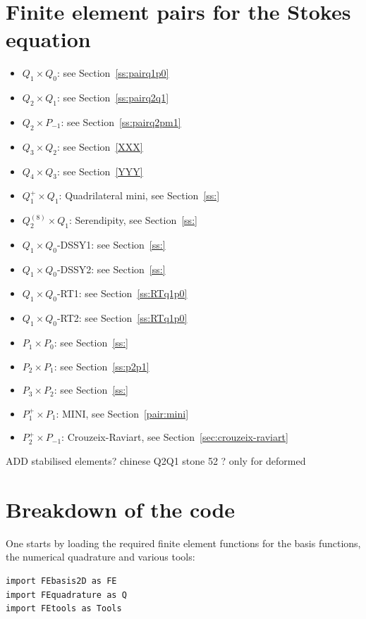 \section*{Finite element pairs for the Stokes equation}

\begin{itemize}
\item $Q_1\times Q_0$: see Section~\ref{ss:pairq1p0}
\item $Q_2\times Q_1$: see Section~\ref{ss:pairq2q1}
\item $Q_2\times P_{-1}$: see Section~\ref{ss:pairq2pm1}
\item $Q_3\times Q_2$: see Section~\ref{XXX}
\item $Q_4\times Q_3$: see Section~\ref{YYY}
\item $Q_1^+\times Q_1$: Quadrilateral mini, see Section~\ref{ss:}
\item $Q_2^{(8)}\times Q_1$: Serendipity, see Section~\ref{ss:}
\item $Q_1\times Q_0$-DSSY1: see Section~\ref{ss:}
\item $Q_1\times Q_0$-DSSY2: see Section~\ref{ss:}
\item $Q_1\times Q_0$-RT1: see Section~\ref{ss:RTq1p0}
\item $Q_1\times Q_0$-RT2: see Section~\ref{ss:RTq1p0}
\item $P_1\times P_0$: see Section~\ref{ss:}
\item $P_2\times P_1$: see Section~\ref{ss:p2p1}
\item $P_3\times P_2$: see Section~\ref{ss:}
\item $P_1^{+}\times P_{1}$: MINI, see Section~\ref{pair:mini}
\item $P_2^+\times P_{-1}$: Crouzeix-Raviart, see Section~\ref{sec:crouzeix-raviart}
\end{itemize}

ADD stabilised elements?
chinese Q2Q1 stone 52 ? only for deformed

\section*{Breakdown of the code}

One starts by loading the required finite element functions 
for the basis functions, the numerical quadrature and various tools:
\begin{lstlisting}
import FEbasis2D as FE
import FEquadrature as Q
import FEtools as Tools 
\end{lstlisting}

